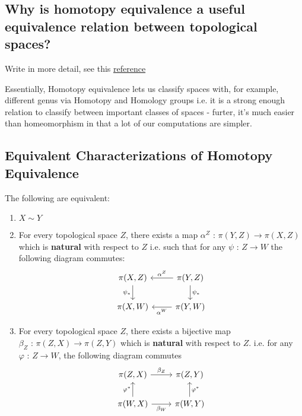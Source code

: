 \documentclass[11pt]{article}
\begin{document}
\subsection*{Why is homotopy equivalence a useful equivalence relation between topological spaces?}

\begin{thought}
  {Write in more detail, see this \href{https://math.stackexchange.com/questions/3357335/homotopy-equivalence-between-spaces-intuition}{reference}}
\end{thought} Essentially, Homotopy equivalence lets us classify spaces with, for example, different genus via Homotopy and Homology groups i.e. it is a strong enough relation to classify between important classes of spaces - furter, it's much easier than homeomorphism in that a lot of our computations are simpler.

\subsection*{Equivalent Characterizations of Homotopy Equivalence}

\begin{bluebox}
  \begin{theorem}
    The following are equivalent: 
    \begin{enumerate}[label=(\alph*)]
      \item $X \sim Y$ 
      \item For every topological space $Z$, there exists a map $\alpha^Z \text{ : } \pi(Y, Z) \rightarrow \pi(X, Z)$ which is \textbf{natural} with respect to $Z$ i.e. such that for any $\psi \text{ : } Z \rightarrow W$ the following diagram commutes: 
      \[\begin{tikzcd}
        {\pi(X, Z)} & {\pi(Y, Z)} \\
        {\pi(X, W)} & {\pi(Y, W)}
        \arrow["{\alpha^Z}"', from=1-2, to=1-1]
        \arrow["{\alpha^W}", from=2-2, to=2-1]
        \arrow["{\psi_*}"', from=1-1, to=2-1]
        \arrow["{\psi_*}", from=1-2, to=2-2]
      \end{tikzcd}\]
      \item For every topological space $Z$, there exists a bijective map $\beta_Z \text{ : } \pi(Z, X) \rightarrow \pi(Z, Y)$ which is \textbf{natural} with respect to $Z$.
      i.e. for any $\varphi \text{ : } Z \rightarrow W$, the following diagram commutes
      \[\begin{tikzcd}
      {\pi(Z, X)} & {\pi(Z, Y)} \\
      {\pi(W, X)} & {\pi(W, Y)}
      \arrow["{\beta_Z}", from=1-1, to=1-2]
      \arrow["{\beta_W}"', from=2-1, to=2-2]
      \arrow["{\varphi^*}", from=2-1, to=1-1]
      \arrow["{\varphi^*}"', from=2-2, to=1-2]
      \end{tikzcd}\]
    \end{enumerate}
  \end{theorem}
\end{bluebox}
\end{document}
